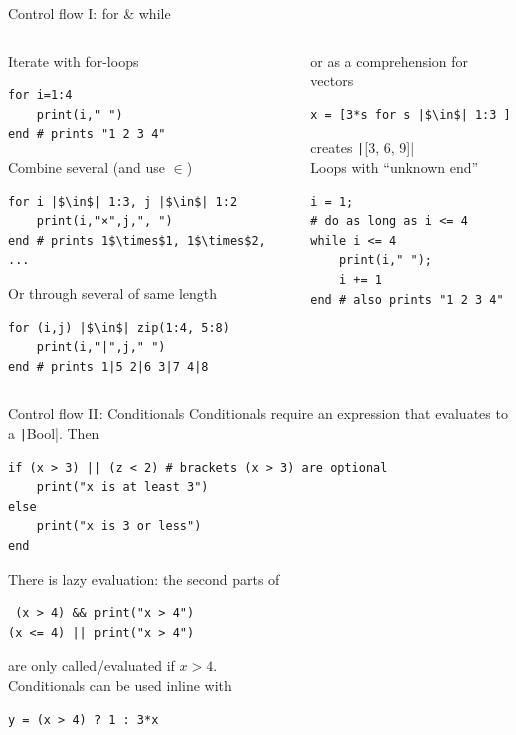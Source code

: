 \documentclass[aspectratio=169, 12pt]{beamer}
\begin{document}
    \begin{frame}[fragile]{Control flow I: for \& while}
        \begin{columns}[T]
            \begin{column}{.5\textwidth}
                \alert{Iterate} with for-loops
                \begin{verbatim}
for i=1:4
    print(i," ")
end # prints "1 2 3 4"
                \end{verbatim}
                \pause
                Combine several (and use $\in$)
                \begin{verbatim}
for i |$\in$| 1:3, j |$\in$| 1:2
    print(i,"×",j,", ")
end # prints 1$\times$1, 1$\times$2, ...
                \end{verbatim}
                \pause
                Or through several of same length
                \begin{verbatim}
for (i,j) |$\in$| zip(1:4, 5:8)
    print(i,"|",j," ")
end # prints 1|5 2|6 3|7 4|8
                \end{verbatim}
            \end{column}
            \pause
            \begin{column}{.5\textwidth}
                or as a \alert{comprehension} for vectors
                \begin{verbatim}
x = [3*s for s |$\in$| 1:3 ]
                \end{verbatim}
                creates \texttt|[3, 6, 9]|
                \\[2.5\baselineskip]
                Loops with “unknown end”
                \begin{verbatim}
i = 1;
# do as long as i <= 4
while i <= 4
    print(i," ");
    i += 1
end # also prints "1 2 3 4"
                \end{verbatim}
            \end{column}
        \end{columns}
    \end{frame}
    \begin{frame}[fragile]{Control flow II: Conditionals}
        \alert{Conditionals} require an expression that evaluates to a \texttt|Bool|. Then
        \begin{verbatim}
if (x > 3) || (z < 2) # brackets (x > 3) are optional
    print("x is at least 3")
else
    print("x is 3 or less")
end
        \end{verbatim}
        \pause
        There is \alert{lazy evaluation}: the second parts of
        \begin{verbatim}
 (x > 4) && print("x > 4")
(x <= 4) || print("x > 4")
        \end{verbatim}
        are only called/evaluated if $x > 4$.
        \\[\baselineskip]
        \pause
        Conditionals can be used inline with
        \begin{verbatim}
y = (x > 4) ? 1 : 3*x
        \end{verbatim}
    \end{frame}
\end{document}
